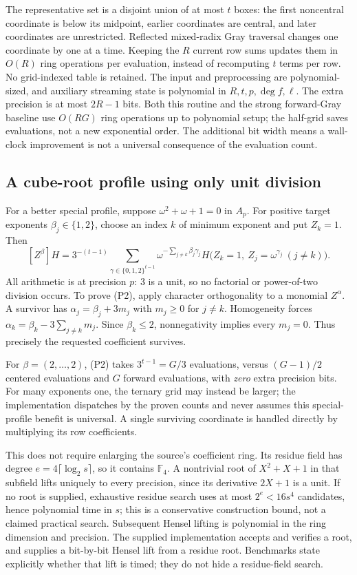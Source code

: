 The representative set is a disjoint union of at most $t$ boxes: the first
noncentral coordinate is below its midpoint, earlier coordinates are central,
and later coordinates are unrestricted. Reflected mixed-radix Gray traversal
changes one coordinate by one at a time. Keeping the $R$ current row sums updates
them in $O(R)$ ring operations per evaluation, instead of recomputing $t$
terms per row. No grid-indexed table is retained. The input and preprocessing
are polynomial-sized, and auxiliary streaming state is polynomial in
$R,t,p,\deg f,\ell$. The extra precision is at most $2R-1$ bits. Both this
routine and the strong forward-Gray baseline use $O(RG)$ ring operations up to
polynomial setup; the half-grid saves evaluations, not a new exponential order.
The additional bit width means a wall-clock improvement is not a universal
consequence of the evaluation count.

\subsection{A cube-root profile using only unit division}
For a better special profile, suppose $\omega^2+\omega+1=0$ in $A_p$.
For positive target exponents $\beta_j\in\{1,2\}$, choose an index $k$ of minimum
exponent and put $Z_k=1$. Then
\[
 [Z^\beta]H
 =3^{-(t-1)}
 \sum_{\gamma\in\{0,1,2\}^{t-1}}
 \omega^{-\sum_{j\ne k}\beta_j\gamma_j}
 H\bigl(Z_k=1,\ Z_j=\omega^{\gamma_j}\ (j\ne k)\bigr).       \tag{P2}
\]
All arithmetic is at precision $p$: $3$ is a unit, so no factorial or
power-of-two division occurs. To prove (P2), apply character orthogonality to a
monomial $Z^\alpha$. A survivor has
$\alpha_j=\beta_j+3m_j$ with $m_j\ge0$ for $j\ne k$. Homogeneity forces
$\alpha_k=\beta_k-3\sum_{j\ne k}m_j$. Since $\beta_k\le2$, nonnegativity
implies every $m_j=0$. Thus precisely the requested coefficient survives.

For $\beta=(2,\ldots,2)$, (P2) takes $3^{t-1}=G/3$ evaluations, versus
$(G-1)/2$ centered evaluations and $G$ forward evaluations, with \emph{zero}
extra precision bits. For many exponents one, the ternary grid may instead be
larger; the implementation dispatches by the proven counts and never assumes
this special-profile benefit is universal. A single surviving coordinate is
handled directly by multiplying its row coefficients.

This does not require enlarging the source's coefficient ring. Its residue
field has degree $e=4\lceil\log_2s\rceil$, so it contains $\mathbb F_4$.
A nontrivial root of $X^2+X+1$ in that subfield lifts uniquely to every precision,
since its derivative $2X+1$ is a unit. If no root is supplied, exhaustive residue
search uses at most $2^e<16s^4$ candidates, hence polynomial time in $s$;
this is a conservative construction bound, not a claimed practical search.
Subsequent Hensel lifting is polynomial in the ring dimension and precision.
The supplied implementation accepts and verifies a root, and supplies a
bit-by-bit Hensel lift from a residue root. Benchmarks state explicitly whether
that lift is timed; they do not hide a residue-field search.

